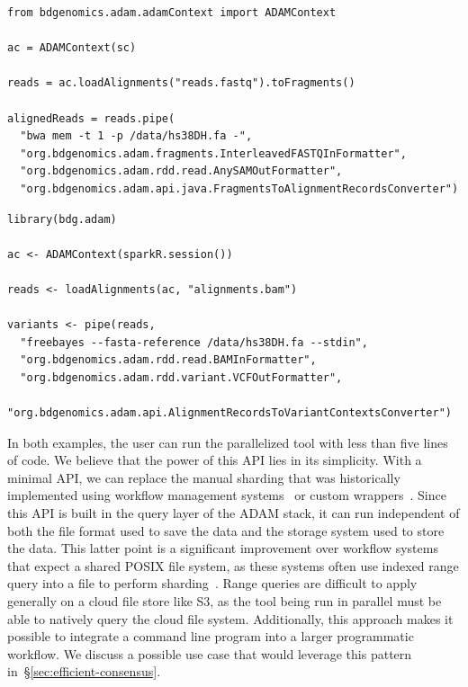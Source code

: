 \documentclass[phd]{ucbthesis}
\begin{document}
\begin{lstlisting}[caption=Calling BWA using the {Python pipe} API, label=lst:pipe-bwa]
from bdgenomics.adam.adamContext import ADAMContext

ac = ADAMContext(sc)

reads = ac.loadAlignments("reads.fastq").toFragments()

alignedReads = reads.pipe(
  "bwa mem -t 1 -p /data/hs38DH.fa -",
  "org.bdgenomics.adam.fragments.InterleavedFASTQInFormatter",
  "org.bdgenomics.adam.rdd.read.AnySAMOutFormatter",
  "org.bdgenomics.adam.api.java.FragmentsToAlignmentRecordsConverter")
\end{lstlisting}

\begin{lstlisting}[caption=Calling {FreeBayes} using the R {pipe} API, label=lst:pipe-freebayes]
library(bdg.adam)

ac <- ADAMContext(sparkR.session())

reads <- loadAlignments(ac, "alignments.bam")

variants <- pipe(reads,
  "freebayes --fasta-reference /data/hs38DH.fa --stdin",
  "org.bdgenomics.adam.rdd.read.BAMInFormatter",
  "org.bdgenomics.adam.rdd.variant.VCFOutFormatter",
  "org.bdgenomics.adam.api.AlignmentRecordsToVariantContextsConverter")
\end{lstlisting}

In both examples, the user can run the parallelized tool with less than five
lines of code. We believe that the power of this API lies in its simplicity.
With a minimal API, we can replace the manual sharding that was historically
implemented using workflow management systems~\cite{depristo11, chiang15} or
custom wrappers~\cite{langmead09crossbow, schatz09, pireddu11, nellore16}. Since this
API is built in the query layer of the {ADAM} stack, it can run
independent of both the file format used to save the data and the storage
system used to store the data. This latter point is a significant improvement
over workflow systems that expect a shared POSIX file system, as these systems
often use indexed range query into a file to perform sharding~\cite{chiang15}.
Range queries are difficult to apply generally on a cloud file store like S3, as the
tool being run in parallel must be able to natively query the cloud file system.
Additionally, this approach makes it possible to integrate a command line
program into a larger programmatic workflow. We discuss a possible use case that
would leverage this pattern in~\S\ref{sec:efficient-consensus}.
\end{document}
